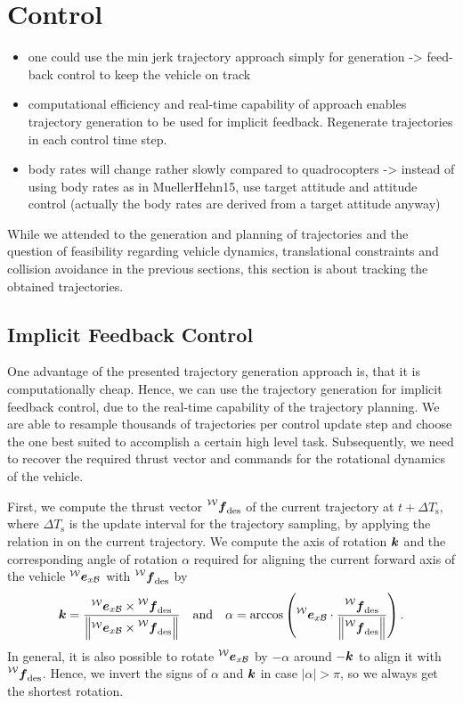 \section{Control}
\label{sec:control}
\begin{itemize}
	\color{red}
	\item one could use the min jerk trajectory approach simply for generation -> feed-back control to keep the vehicle on track
	\item computational efficiency and real-time capability of approach enables trajectory generation to be used for implicit feedback. Regenerate trajectories in each control time step.
	\item body rates will change rather slowly compared to quadrocopters -> instead of using body rates as in MuellerHehn15, use target attitude and attitude control (actually the body rates are derived from a target attitude anyway)
\end{itemize}
While we attended to the generation and planning of trajectories and the question of feasibility regarding vehicle dynamics, translational constraints and collision avoidance in the previous sections, this section is about tracking the obtained trajectories.

\subsection{Implicit Feedback Control}

One advantage of the presented trajectory generation approach is, that it is computationally cheap. Hence, we can use the trajectory generation for implicit feedback control, due to the real-time capability of the trajectory planning. We are able to resample thousands of trajectories per control update step and choose the one best suited to accomplish a certain high level task.
Subsequently, we need to recover the required thrust vector and commands for the rotational dynamics of the vehicle.

First, we compute the thrust vector $\thrustdesiredworld$ of the current trajectory at $t+\Delta T_\text{s}$, where $\Delta T_{\text{s}}$ is the update interval for the trajectory sampling, by applying the relation in  on the current trajectory.
We compute the axis of rotation $\mbox{$\bm{k}$}$ and the corresponding angle of rotation $\alpha$ required for aligning the current forward axis of the vehicle $\prescript{\mathcal{W}}{}{\mbox{$\bm{e}$}}_{x\mathcal{B}}$ with $\thrustdesiredworld$ by
\begin{equation}
	\label{eq:rotation-to-desired-thrust-vector}
	\kb = \frac{
		\exbodyinworld \times \thrustdesiredworld
	}{
		\left\lVert
			\exbodyinworld \times \thrustdesiredworld
		\right\rVert}
	\quad
	\text{and}
	\quad
	\alpha = \arccos\left(
		\exbodyinworld \cdot
		\frac{\thrustdesiredworld}{\left\lVert\thrustdesiredworld\right\rVert}
	\right)
	.
\end{equation}
In general, it is also possible to rotate $\prescript{\mathcal{W}}{}{\mbox{$\bm{e}$}}_{x\mathcal{B}}$ by $-\alpha$ around $-\mbox{$\bm{k}$}$ to align it with $\thrustdesiredworld$. Hence, we invert the signs of $\alpha$ and $\mbox{$\bm{k}$}$ in case $\lvert\alpha\rvert > \pi$, so we always get the shortest rotation. 

